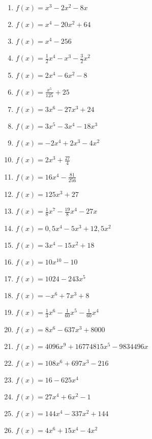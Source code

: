 \begin{Exercise}[title={Berechne die Nullstellen}, label=ganzNSTA1]

	\begin{minipage}{\textwidth}
		\begin{minipage}{0.5\textwidth}
			\begin{enumerate}[label=\alph*)]
				\item \(f(x)=x^3-2x^2-8x\)
				\item \(f(x)=x^4-20x^2+64\)
				\item \(f(x)=x^4-256\)
				\item \(f(x)=\frac{1}{2}x^4-x^3-\frac{3}{2}x^2\)
				\item \(f(x)=2x^4-6x^2-8\)
				\item \(f(x)=\frac{x^5}{125}+25\)
				\item \(f(x)=3x^6-27x^3+24\)
				\item \(f(x)=3x^5-3x^4-18x^3\)
				\item \(f(x)=-2x^4+2x^3-4x^2\)
				\item \(f(x)=2x^3+\frac{27}{4}\)
				\item \(f(x)=16x^4-\frac{81}{256}\)
				\item \(f(x)=125x^3+27\)
				\item \(f(x)=\frac{1}{8}x^7-\frac{19}{8}x^4-27x\)
			\end{enumerate}
		\end{minipage}%
		\begin{minipage}{0.5\textwidth}
			\begin{enumerate}[label=\alph*)]
				\setcounter{enumi}{13}
				\item \(f(x)=0,5x^4-5x^3+12,5x^2\)
				\item \(f(x)=3x^4-15x^2+18\)
				\item \(f(x)=10x^{10}-10\)
				\item \(f(x)=1024-243x^5\)
				\item \(f(x)=-x^6+7x^3+8\)
				\item \(f(x)=\frac{1}{3}x^6-\frac{1}{60}x^5-\frac{1}{60}x^4\)
				\item \(f(x)=8x^6-637x^3+8000\)
				\item \(f(x)=4096x^9+16774815x^5-9834496x\)
				\item \(f(x)=108x^6+697x^3-216\)
				\item \(f(x)=16-625x^4\)
				\item \(f(x)=27x^4+6x^2-1\)
				\item \(f(x)=144x^4-337x^2+144\)
				\item \(f(x)=4x^6+15x^4-4x^2\)
			\end{enumerate}
		\end{minipage}%
	\end{minipage}
\end{Exercise}

